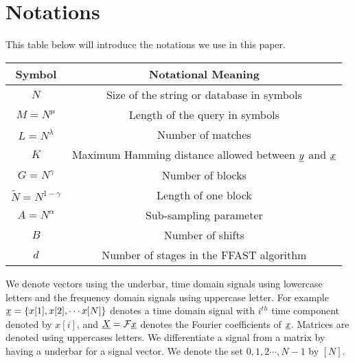 \section{Notations}

This table below will introduce the notations we use in this paper.

\begin{center}
	
	\begin{tabular}{|c|c|}
		
		\hline
		
		Symbol     &  Notational Meaning \\
		
		\hline
		
		$N$           & Size of the string or database in symbols \\
		\hline
		$M = N^{\mu}$           & Length of the query in symbols \\
		\hline
        $L = N^\lambda$  &   Number of matches \\
        \hline
        $K$             & Maximum Hamming distance allowed between $\underline{y}$ and $\underline{x}$ \\
        \hline
		$G = N^\gamma$           & Number of blocks \\
		\hline
		$\tilde{N} = N^{1-\gamma}$   & Length of one block \\
		\hline
		$A = N^\alpha$      & Sub-sampling parameter \\
		\hline
		$B$       & Number of shifts  \\
		\hline
		$d$           & Number of stages in the FFAST algorithm \\
		\hline
	\end{tabular}
\end{center}	
	
	\vspace{15pt}


We denote vectors using the underbar, time domain signals using lowercase letters and the frequency domain signals using uppercase letter. For example $\underline{x} = \{x[1],x[2], \cdots x[N] \}$ denotes a time domain signal with $i^{th}$ time component denoted by $x[i]$, and $\underline{X}= \mathcal{F}\underline{x}$ denotes the Fourier coefficients of $\underline{x}$. Matrices are denoted using uppercases letters. We differentiate a signal from a matrix by having a underbar for a signal vector. We denote the set ${0,1,2\cdots, N-1}$ by $[N]$.
	
	

